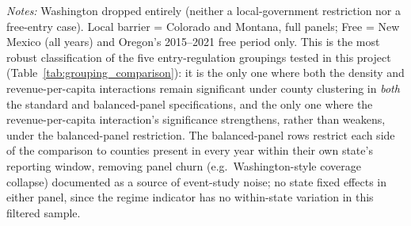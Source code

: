 \begin{table}[htbp]
\centering
\caption{Primary specification: border $\times$ regime interaction, Local barrier (CO+MT) vs.\ Free (NM + Oregon 2015--2021), Washington dropped}
\label{tab:groupD_primary}
\footnotesize
{}
\begin{minipage}{0.98\textwidth}
\vspace{0.3em}
\footnotesize
\textit{Notes:} Washington dropped entirely (neither a local-government restriction nor a free-entry case).
Local barrier = Colorado and Montana, full panels; Free = New Mexico (all years) and Oregon's 2015--2021
free period only. This is the most robust classification of the five entry-regulation groupings tested in this
project (Table~\ref{tab:grouping_comparison}): it is the only one where both the density and revenue-per-capita
interactions remain significant under county clustering in \emph{both} the standard and balanced-panel
specifications, and the only one where the revenue-per-capita interaction's significance strengthens, rather
than weakens, under the balanced-panel restriction. The balanced-panel rows restrict each side of the
comparison to counties present in every year within their own state's reporting window, removing panel churn
(e.g.\ Washington-style coverage collapse) documented as a source of event-study noise; no state fixed effects
in either panel, since the regime indicator has no within-state variation in this filtered sample.
\end{minipage}
\end{table}
